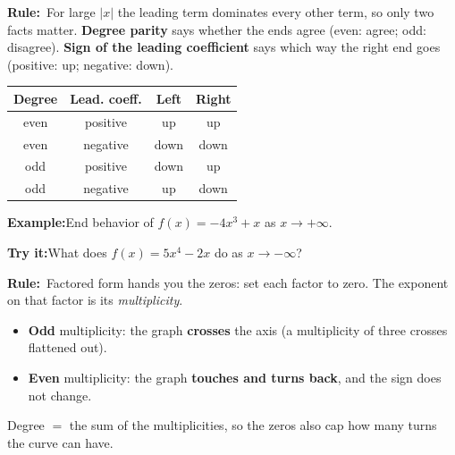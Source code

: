 \documentclass[12pt]{article}
\begin{document}


\begin{formulabox}\textbf{Rule:}\ For large $|x|$ the leading term dominates
every other term, so only two facts matter. \textbf{Degree parity} says whether
the ends agree (even: agree; odd: disagree). \textbf{Sign of the leading
coefficient} says which way the right end goes (positive: up; negative: down).
\begin{center}
\begin{tabular}{|c|c|c|c|}
\hline
\textbf{Degree} & \textbf{Lead. coeff.} & \textbf{Left} & \textbf{Right} \\ \hline
even & positive & up & up \\ \hline
even & negative & down & down \\ \hline
odd & positive & down & up \\ \hline
odd & negative & up & down \\ \hline
\end{tabular}
\end{center}
\end{formulabox}

\begin{examplebox}\textbf{Example:}\quad End behavior of
$f(x) = -4x^3 + x$ as $x \to +\infty$.
\end{examplebox}

\begin{tryitbox}\textbf{Try it:}\quad What does $f(x) = 5x^4 - 2x$ do as
$x \to -\infty$?
\ \end{tryitbox}


\begin{formulabox}\textbf{Rule:}\ Factored form hands you the zeros: set each
factor to zero. The exponent on that factor is its \emph{multiplicity}.
\begin{itemize}[leftmargin=1.1cm, itemsep=1pt, topsep=2pt]
  \item \textbf{Odd} multiplicity: the graph \textbf{crosses} the axis (a
        multiplicity of three crosses flattened out).
  \item \textbf{Even} multiplicity: the graph \textbf{touches and turns back},
        and the sign does not change.
\end{itemize}
Degree $=$ the sum of the multiplicities, so the zeros also cap how many turns
the curve can have.
\end{formulabox}
\end{document}
